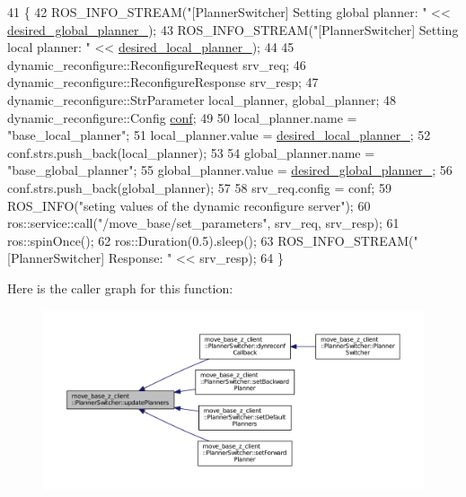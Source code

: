 \begin{DoxyCode}
41 \{
42   ROS\_INFO\_STREAM(\textcolor{stringliteral}{"[PlannerSwitcher] Setting global planner: "} << 
      \hyperlink{classmove__base__z__client_1_1PlannerSwitcher_a004c15858f0a6b9abcd8211d58a7e34c}{desired\_global\_planner\_});
43   ROS\_INFO\_STREAM(\textcolor{stringliteral}{"[PlannerSwitcher] Setting local planner: "} << 
      \hyperlink{classmove__base__z__client_1_1PlannerSwitcher_ae47bd6c9c70b27cddcb394f26bb9372d}{desired\_local\_planner\_});
44 
45   dynamic\_reconfigure::ReconfigureRequest srv\_req;
46   dynamic\_reconfigure::ReconfigureResponse srv\_resp;
47   dynamic\_reconfigure::StrParameter local\_planner, global\_planner;
48   dynamic\_reconfigure::Config \hyperlink{namespaceconf}{conf};
49 
50   local\_planner.name = \textcolor{stringliteral}{"base\_local\_planner"};
51   local\_planner.value = \hyperlink{classmove__base__z__client_1_1PlannerSwitcher_ae47bd6c9c70b27cddcb394f26bb9372d}{desired\_local\_planner\_};
52   conf.strs.push\_back(local\_planner);
53 
54   global\_planner.name = \textcolor{stringliteral}{"base\_global\_planner"};
55   global\_planner.value = \hyperlink{classmove__base__z__client_1_1PlannerSwitcher_a004c15858f0a6b9abcd8211d58a7e34c}{desired\_global\_planner\_};
56   conf.strs.push\_back(global\_planner);
57 
58   srv\_req.config = conf;
59   ROS\_INFO(\textcolor{stringliteral}{"seting values of the dynamic reconfigure server"});
60   ros::service::call(\textcolor{stringliteral}{"/move\_base/set\_parameters"}, srv\_req, srv\_resp);
61   ros::spinOnce();
62   ros::Duration(0.5).sleep();
63   ROS\_INFO\_STREAM(\textcolor{stringliteral}{"[PlannerSwitcher] Response: "} << srv\_resp);
64 \}
\end{DoxyCode}


Here is the caller graph for this function\+:
\nopagebreak
\begin{figure}[H]
\begin{center}
\leavevmode
\includegraphics[width=350pt]{classmove__base__z__client_1_1PlannerSwitcher_a189ac8c027169a111c7d8e14d864752f_icgraph}
\end{center}
\end{figure}




